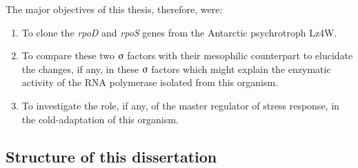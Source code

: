 The major objectives of this thesis, therefore, were:

\begin{enumerate}

\item To clone the \emph{rpoD} and \emph{rpoS} genes from the
Antarctic psychrotroph  Lz4W.

\item To compare these two $\sigmaup$ factors with their
mesophilic counterpart to elucidate the changes, if any, in these
$\sigmaup$ factors which might explain the enzymatic activity of
the RNA polymerase isolated from this organism.

\item To investigate the role, if any,  of the master regulator of
stress response, \sigs{} in the cold-adaptation of this organism.

\end{enumerate}


\subsection*{Structure of this dissertation}

